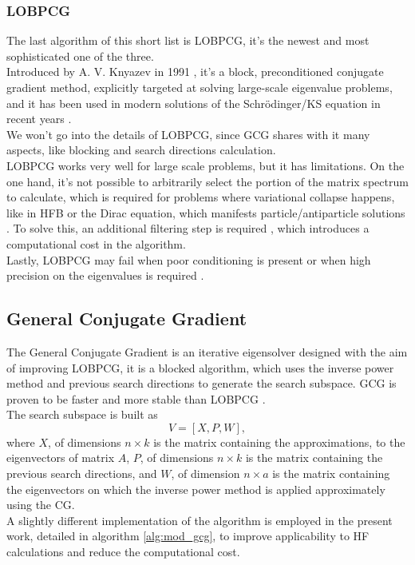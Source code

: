 \subsubsection{LOBPCG}
The last algorithm of this short list is LOBPCG, it's the newest and most sophisticated one of the three.
\\Introduced by A. V. Knyazev in 1991 \cite{LOBPCG}, it's a block, preconditioned conjugate gradient method, explicitly targeted at solving large-scale eigenvalue problems, and it has been used in modern solutions of the Schr\"odinger/KS equation in recent years \cite{LOBPCGDKS,Nottoli2023,LIN2013205,li2020efficient}.
\\We won't go into the details of LOBPCG, since GCG shares with it many aspects, like blocking and search directions calculation.
\\LOBPCG works very well for large scale problems, but it has limitations. 
On the one hand, it's not possible to arbitrarily select the portion of the matrix spectrum to calculate, which is required for problems where variational collapse happens, like in HFB or the Dirac equation, which manifests particle/antiparticle solutions \cite{li2020efficient}.
To solve this, an additional filtering step is required \cite{LIN2013205,li2020efficient}, which introduces a computational cost in the algorithm.
\\Lastly, LOBPCG may fail when poor conditioning is present or when high precision on the eigenvalues is required \cite{GCG1}.
\subsection{General Conjugate Gradient}
\label{sec:gcg}
The General Conjugate Gradient is an iterative eigensolver designed with the aim of improving LOBPCG, it is a blocked algorithm, which uses the inverse power method and previous search directions to generate the search subspace. GCG is proven to be faster and more stable than LOBPCG \cite{GCG1}.
\\The search subspace is built as
\begin{equation}
    V = [X, P, W],
\end{equation}
where $X$, of dimensions $n\times k$ is the matrix containing the approximations, to the eigenvectors of matrix $A$, $P$, of dimensions $n\times k$ is the matrix containing the previous search directions, and $W$, of dimension $n\times a$ is the matrix containing the eigenvectors on which the inverse power method is applied approximately using the CG.
\\A slightly different implementation of the algorithm is employed in the present work, detailed in algorithm \ref{alg:mod_gcg}, to improve applicability to HF calculations and reduce the computational cost.

